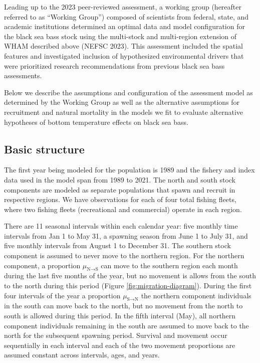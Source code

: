 \documentclass[
]{article}
\begin{document}
Leading up to the 2023 peer-reviewed assessment, a working group
(hereafter referred to as ``Working Group'') composed of scientists from
federal, state, and academic institutions determined an optimal data and
model configuration for the black sea bass stock using the multi-stock
and multi-region extension of WHAM described above (NEFSC 2023). This
assessment included the spatial features and investigated inclusion of
hypothesized environmental drivers that were prioritized research
recommendations from previous black sea bass assessments.

Below we describe the assumptions and configuration of the assessment
model as determined by the Working Group as well as the alternative
assumptions for recruitment and natural mortality in the models we fit
to evaluate alternative hypotheses of bottom temperature effects on
black sea bass.

\hypertarget{basic-structure}{%
\subsection*{Basic structure}\label{basic-structure}}

The first year being modeled for the population is 1989 and the fishery
and index data used in the model span from 1989 to 2021. The north and
south stock components are modeled as separate populations that spawn
and recruit in respective regions. We have observations for each of four
total fishing fleets, where two fishing fleets (recreational and
commercial) operate in each region.

There are 11 seasonal intervals within each calendar year: five monthly
time intervals from Jan 1 to May 31, a spawning season from June 1 to
July 31, and five monthly intervals from August 1 to December 31. The
southern stock component is assumed to never move to the northern
region. For the northern component, a proportion
\(\mu_{\text{N}\rightarrow \text{S}}\) can move to the southern region
each month during the last five months of the year, but no movement is
allows from the south to the north during this period (Figure
\ref{fig:migration-diagram}). During the first four intervals of the
year a proportion \(\mu_{\text{S}\rightarrow \text{N}}\) the northern
component individuals in the south can move back to the north, but no
movement from the north to south is allowed during this period. In the
fifth interval (May), all northern component individuals remaining in
the south are assumed to move back to the north for the subsequent
spawning period. Survival and movement occur sequentially in each
interval and each of the two movement proportions are assumed constant
across intervals, ages, and years.
\end{document}
